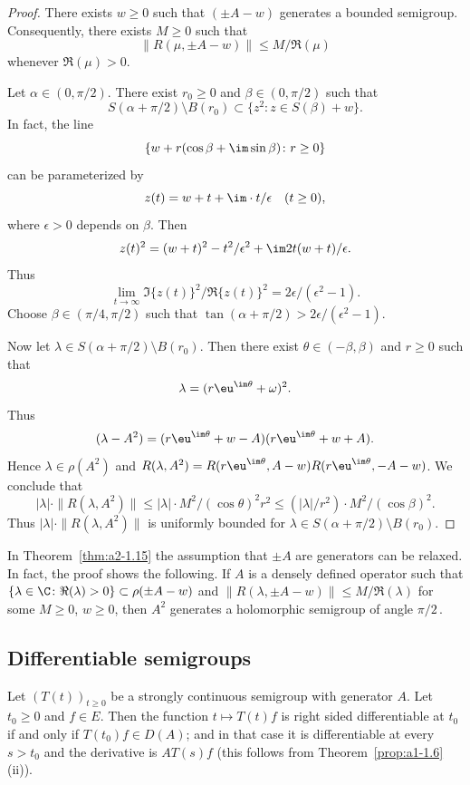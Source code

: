 \begin{proof}
There exists $w \geq 0$ such that $(\pm A - w)$ generates a bounded semigroup.
Consequently, there exists $M \geq 0$ such that 
%
\[
	\|R(\mu,\pm A - w)\| \leq M/\Re(\mu)
\]
%
whenever $\Re(\mu) > 0$.

Let $\alpha \in (0,\pi/2)$.
There exist $r_0 \geq 0$ and $\beta \in (0,\pi/2)$ such that
\[
    S(\alpha+\pi/2)\setminus B(r_{0}) \subset \{ z^2 \colon z \in S(\beta) + w \}.
\]
In fact, the line 
%
\[
	\{w + r(\cos\beta + \im \sin\beta) \colon r \geq 0\} 
\]
%
can be parameterized by 
%
\[
	 z(t) = w + t + \im\cdot t/\epsilon \quad (t \geq 0) ,
\]
%
where $\epsilon > 0$ depends on $\beta$.
Then 
%
\[
	z(t)^2 = (w + t)^2 - t^2/\epsilon^2 + \im 2t(w+t)/\epsilon .
\]
%
Thus 
%
\[
	\lim_{t \to \infty} \Im\{z(t)\}^2/\Re\{z(t)\}^2 = 2\epsilon/(\epsilon^2-1) .
\]
%
Choose $\beta \in (\pi/4,\pi/2)$ such that $\tan(\alpha + \pi/2) > 2\epsilon/(\epsilon^2-1)$. 

Now let $\lambda \in S(\alpha+\pi/2)\setminus B(r_{0})$.
Then there exist $\theta \in (-\beta,\beta)$ and $r \geq 0$ such that 
%
\[
	 \lambda = (r\eu^{\im\theta}+\omega)^2 .
\]
%
Thus %
\[
	(\lambda-A^2) = (r\eu^{\im\theta}+w - A)(r\eu^{\im\theta}+w + A) .
\]
%
Hence $\lambda \in \rho(A^2)$ and $R(\lambda,A^2) = R(r\eu^{\im\theta},A-w)R(r\eu^{\im\theta},-A-w)$.
We conclude that 
\[
|\lambda| \cdot \|R(\lambda,A^2)\| \leq |\lambda| \cdot M^2/(\cos\theta)^2r^2 \leq (|\lambda|/r^2)\cdot M^2/(\cos\beta)^2.
\]
Thus $|\lambda| \cdot \|R(\lambda,A^2)\|$ is uniformly bounded for $\lambda \in S(\alpha+\pi/2) \setminus B(r_0)$.
\end{proof}
\begin{remark*}\label{rem:a2-1.7-kgk}
In Theorem~\ref{thm:a2-1.15}  
the assumption that $\pm A$ are generators can be relaxed.
In fact, the proof shows the following.
If\/ $A$ is a densely defined operator such that 
$\{\lambda \in \C \colon \Re(\lambda) > 0\} \subset \rho(\pm A - w)$ and 
$\|R(\lambda,\pm A - w)\| \leq M/\Re(\lambda)$ for some $M \geq 0$, $w \geq 0$, then $A^2$ generates a holomorphic semigroup of angle $\pi/2$\,.
\end{remark*}

\subsection{Differentiable semigroups} \label{subsec:a2-1.se5}%
Let $(T(t))_{t\geq 0}$ be a strongly continuous semigroup with generator $A$.
Let $t_0 \geq 0$ and $f \in E$.
Then the function $t \mapsto T(t)f$ is right sided differentiable at $t_0$ if and only if\/ $T(t_0)f \in D(A)$; and in that case it is differentiable at every $s > t_0$ and the derivative is $AT(s)f$ (this follows from Theorem~\ref{prop:a1-1.6}\,(ii)).

